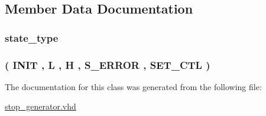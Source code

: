 \subsection{Member Data Documentation}
\subsubsection[{\texorpdfstring{state}{state}}]{ {\bfseries {\bfseries {\bf state\+\_\+type}} \textcolor{vhdlchar}{ }} \hspace{0.3cm}{\ttfamily [Signal]}}\hypertarget{classstop__generator_1_1fsm_ad5c908d9d78df85b2f0aa3b36b05c3a5}{}\label{classstop__generator_1_1fsm_ad5c908d9d78df85b2f0aa3b36b05c3a5}
\subsubsection[{\texorpdfstring{state\+\_\+type}{state_type}}]{ {\bfseries \textcolor{vhdlchar}{(}\textcolor{vhdlchar}{ }\textcolor{vhdlchar}{I\+N\+IT}\textcolor{vhdlchar}{ }\textcolor{vhdlchar}{,}\textcolor{vhdlchar}{ }\textcolor{vhdlchar}{L}\textcolor{vhdlchar}{ }\textcolor{vhdlchar}{,}\textcolor{vhdlchar}{ }\textcolor{vhdlchar}{H}\textcolor{vhdlchar}{ }\textcolor{vhdlchar}{,}\textcolor{vhdlchar}{ }\textcolor{vhdlchar}{S\+\_\+\+E\+R\+R\+OR}\textcolor{vhdlchar}{ }\textcolor{vhdlchar}{,}\textcolor{vhdlchar}{ }\textcolor{vhdlchar}{S\+E\+T\+\_\+\+C\+TL}\textcolor{vhdlchar}{ }\textcolor{vhdlchar}{)}\textcolor{vhdlchar}{ }} \hspace{0.3cm}{\ttfamily [Type]}}\hypertarget{classstop__generator_1_1fsm_aec03e7046c55ad7f97c414ee96c80e3f}{}\label{classstop__generator_1_1fsm_aec03e7046c55ad7f97c414ee96c80e3f}


The documentation for this class was generated from the following file\+:\begin{DoxyCompactItemize}
\item 
\hyperlink{stop__generator_8vhd}{stop\+\_\+generator.\+vhd}\end{DoxyCompactItemize}
